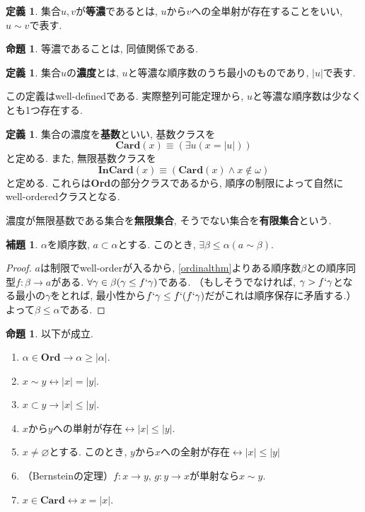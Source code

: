 \documentclass[a4paper, twoside]{bxjsarticle}
\newcommand{\abs}[1]{\left\lvert#1\right\rvert}
\theoremstyle{definition}
\newtheorem{prop}[thm]{命題}
\newtheorem{defn}[thm]{定義}
\newtheorem{lem}[thm]{補題}
\begin{document}
        \begin{defn}
            集合$u, v$が\textbf{等濃}であるとは, $u$から$v$への全単射が存在することをいい, $u \sim v$で表す. 
        \end{defn}
        \begin{prop}
            等濃であることは, 同値関係である.
        \end{prop}
        \begin{defn}
            集合$u$の\textbf{濃度}とは, $u$と等濃な順序数のうち最小のものであり, $\abs{u}$で表す. 
            
            この定義はwell-definedである. 実際整列可能定理から, $u$と等濃な順序数は少なくとも1つ存在する.
        \end{defn}
        \begin{defn}
            集合の濃度を\textbf{基数}といい, 基数クラスを\[\textbf{Card}(x)\equiv(\exists u(x=\abs{u}))\]と定める. また, 無限基数クラスを\[\textbf{InCard}(x)\equiv(\textbf{Card}(x)\land x\not\in\omega)\]と定める. これらは\textbf{Ord}の部分クラスであるから, 順序の制限によって自然にwell-orderedクラスとなる.
            
            濃度が無限基数である集合を\textbf{無限集合}, そうでない集合を\textbf{有限集合}という.
        \end{defn}
        \begin{lem}
            $\alpha$を順序数, $a\subset\alpha$とする. このとき, $\exists \beta\leq\alpha(a\sim\beta)$.
        \end{lem}
        \begin{proof}
            $a$は制限でwell-orderが入るから, \ref{ordinalthm}よりある順序数$\beta$との順序同型$f\colon \beta\to a$がある.
            $\forall \gamma\in\beta(\gamma\leq f`\gamma)$である. （もしそうでなければ, $\gamma>f`\gamma$となる最小の$\gamma$をとれば, 最小性から$f`\gamma\leq f`(f`\gamma)$だがこれは順序保存に矛盾する.） よって$\beta\leq\alpha$である.
        \end{proof}
        \begin{prop}
            以下が成立.
            \begin{enumerate}  
                \item $\alpha\in \textbf{Ord}\to \alpha\geq\abs{\alpha}$.
                \item $x \sim y \leftrightarrow \abs{x}=\abs{y}$.
                \item $x\subset y \to \abs{x}\leq\abs{y}$.
                \item $x$から$y$への単射が存在$\leftrightarrow \abs{x}\leq\abs{y}$.
                \item $x\neq\varnothing$とする. このとき, $y$から$x$への全射が存在$\leftrightarrow\abs{x}\leq\abs{y}$
                \item （Bernsteinの定理）$f\colon x\to y$, $g\colon y\to x$が単射なら$x \sim y$.
                \item $x\in \textbf{Card}\leftrightarrow x=\abs{x}$.
            \end{enumerate}
        \end{prop}
\end{document}
